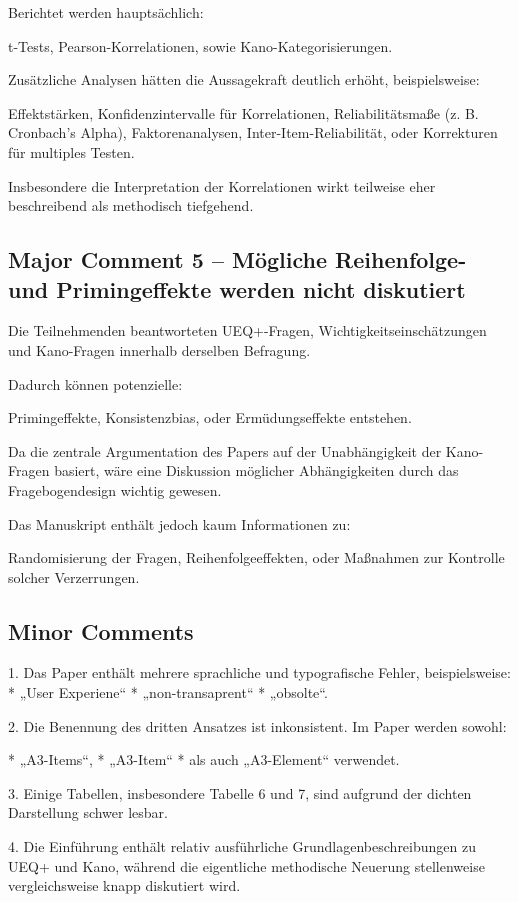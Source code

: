 \documentclass[12pt,DIV=14, version=first, BCOR=10mm,a4paper,twoside,parskip=half-,headsepline,headinclude]{scrartcl}
\begin{document}
Berichtet werden hauptsächlich:

t-Tests,
Pearson-Korrelationen,
sowie Kano-Kategorisierungen.

Zusätzliche Analysen hätten die Aussagekraft deutlich erhöht, beispielsweise:

Effektstärken,
Konfidenzintervalle für Korrelationen,
Reliabilitätsmaße (z. B. Cronbach’s Alpha),
Faktorenanalysen,
Inter-Item-Reliabilität,
oder Korrekturen für multiples Testen.

Insbesondere die Interpretation der Korrelationen wirkt teilweise eher beschreibend als methodisch tiefgehend.

\subsection{Major Comment 5 – Mögliche Reihenfolge- und Primingeffekte werden nicht diskutiert}

Die Teilnehmenden beantworteten UEQ+-Fragen, Wichtigkeitseinschätzungen und Kano-Fragen innerhalb derselben Befragung.

Dadurch können potenzielle:

Primingeffekte,
Konsistenzbias,
oder Ermüdungseffekte entstehen.

Da die zentrale Argumentation des Papers auf der Unabhängigkeit der Kano-Fragen basiert, wäre eine Diskussion möglicher Abhängigkeiten durch das Fragebogendesign wichtig gewesen.

Das Manuskript enthält jedoch kaum Informationen zu:

Randomisierung der Fragen,
Reihenfolgeeffekten,
oder Maßnahmen zur Kontrolle solcher Verzerrungen.
\subsection{Minor Comments}
1. Das Paper enthält mehrere sprachliche und typografische Fehler, beispielsweise:
* „User Experiene“
* „non-transaprent“
* „obsolte“.

2. Die Benennung des dritten Ansatzes ist inkonsistent. Im Paper werden sowohl:

* „A3-Items“,
* „A3-Item“
* als auch „A3-Element“
  verwendet.

3. Einige Tabellen, insbesondere Tabelle 6 und 7, sind aufgrund der dichten Darstellung schwer lesbar.

4. Die Einführung enthält relativ ausführliche Grundlagenbeschreibungen zu UEQ+ und Kano, während die eigentliche methodische Neuerung stellenweise vergleichsweise knapp diskutiert wird.
\end{document}
